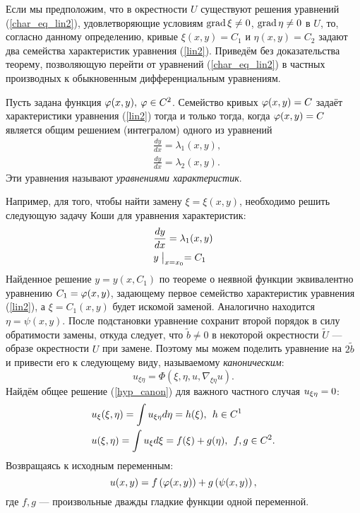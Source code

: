     Если мы предположим, что в окрестности $U$ существуют решения уравнений (\ref{char_eq_lin2}), удовлетворяющие условиям
    $\operatorname{grad} \xi \not= 0$, $\operatorname{grad} \eta \not= 0$ в $U$, то, согласно данному определению, кривые $\xi(x, y) = C_1$ и $\eta(x, y) = C_2$
    задают два семейства характеристик уравнения (\ref{lin2}). Приведём без доказательства теорему, позволяющую перейти от уравнений
    (\ref{char_eq_lin2}) в частных производных к обыкновенным дифференциальным уравнениям.
    \begin{theorem}
        Пусть задана функция $\varphi(x, y),\: \varphi \in C^2$. Семейство кривых $\varphi(x,y)=C$ задаёт характеристики уравнения (\ref{lin2}) тогда и
        только тогда, когда $\varphi(x, y) = C$ является общим решением (интегралом) одного из уравнений
        \begin{align*}
            & \frac{dy}{dx} = \lambda_1(x, y),\\
            & \frac{dy}{dx} = \lambda_2(x, y).
        \end{align*}
        Эти уравнения называют \textit{уравнениями характеристик}.
    \end{theorem}
    Например, для того, чтобы найти замену $\xi = \xi(x,y)$, необходимо решить следующую задачу Коши для уравнения характеристик:
    \begin{align*}
        & \frac{dy}{dx} = \lambda_1(x, y) \\
        & y \bigm|_{x = x_0} = C_1
    \end{align*}
    Найденное решение $y = y(x, C_1)$ по теореме о неявной функции эквивалентно уравнению $C_1 = \varphi(x, y)$, задающему первое семейство
    характеристик уравнения (\ref{lin2}), а $\xi = C_1(x, y)$ будет искомой заменой. Аналогично находится $\eta = \psi(x, y)$.
    После подстановки уравнение сохранит второй порядок в силу обратимости замены, откуда следует, что $\tilde{b} \not= 0$ в некоторой
    окрестности $\tilde{U}$ --- образе окрестности $U$ при замене. Поэтому мы можем поделить уравнение на $2\tilde{b}$ и привести его к
    следующему виду, называемому \textit{каноническим}:
    \begin{equation}
        u_{\xi\eta} = \Phi(\xi, \eta, u, \nabla_{\xi\eta}u). \label{hyp_canon}
    \end{equation}
    Найдём общее решение (\ref{hyp_canon}) для важного частного случая $u_{\xi\eta} = 0$:
    \begin{align*}
        & u_{\xi}(\xi, \eta) = \int u_{\xi\eta} d\eta = h(\xi), \:\: h \in C^1\\
        & u(\xi, \eta) = \int u_{\xi} d\xi = f(\xi) + g(\eta), \:\: f,g \in C^2.
    \end{align*}
    Возвращаясь к исходным переменным:
    \begin{equation}
        u(x, y) = f\left({\varphi(x,y)}\right) + g\left({\psi(x, y)}\right), \label{waveform_gen_sol}
    \end{equation}
    где $f,g$ --- произвольные дважды гладкие функции одной переменной.
